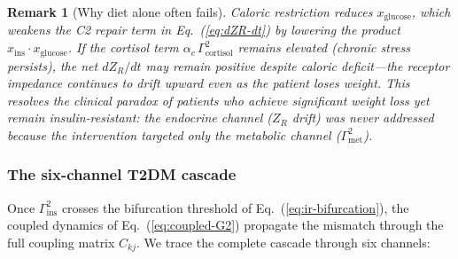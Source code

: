 \documentclass[aps,pre,twocolumn,superscriptaddress,floatfix]{revtex4-2}
\newtheorem{remark}{Remark}
\begin{document}
\begin{remark}[Why diet alone often fails]
\label{rem:diet-alone}
Caloric restriction reduces $x_{\text{glucose}}$,
which weakens the C2 repair term in
Eq.~(\ref{eq:dZR-dt}) by lowering the product
$x_{\text{ins}} \cdot x_{\text{glucose}}$.
If the cortisol term
$\alpha_c\,\Gamma_{\text{cortisol}}^2$ remains
elevated (chronic stress persists), the net
$dZ_R/dt$ may remain positive \emph{despite caloric
deficit}---the receptor impedance continues to
drift upward even as the patient loses weight.
This resolves the clinical paradox of patients
who achieve significant weight loss yet remain
insulin-resistant: the \emph{endocrine} channel
($Z_R$ drift) was never addressed because the
intervention targeted only the \emph{metabolic}
channel ($\Gamma_{\text{met}}^2$).
\end{remark}

\subsubsection{The six-channel T2DM cascade}
\label{sec:t2d-six-channel}

Once $\Gamma_{\text{ins}}^2$ crosses the bifurcation
threshold of Eq.~(\ref{eq:ir-bifurcation}),
the coupled dynamics of
Eq.~(\ref{eq:coupled-G2}) propagate the mismatch
through the full coupling matrix $C_{kj}$.
We trace the complete cascade through six channels:
\end{document}
